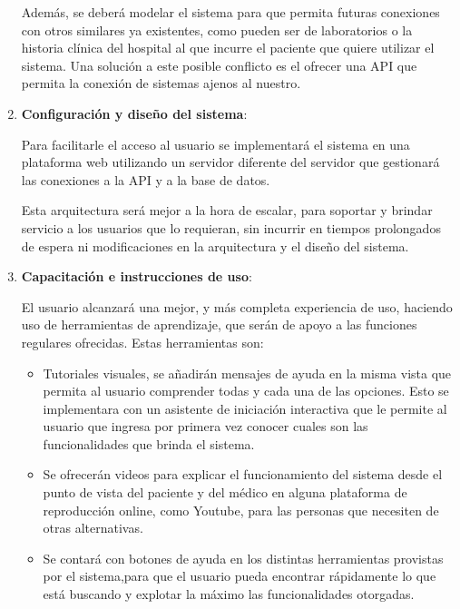 \begin{enumerate}
Además, se deberá modelar el sistema para que permita futuras conexiones con otros similares ya existentes, como pueden ser de laboratorios o la historia clínica del hospital al que incurre el paciente que quiere utilizar el sistema.
Una solución a este posible conflicto es el ofrecer una API que permita la conexión de sistemas ajenos al nuestro.

\item \textbf{Configuración y diseño del sistema}:

Para facilitarle el acceso al usuario se implementará el sistema en una plataforma web utilizando un servidor diferente del servidor que gestionará las conexiones a la API y a la base de datos.

Esta arquitectura será mejor a la hora de escalar, para soportar y brindar servicio a los usuarios que lo requieran, sin incurrir en tiempos prolongados de espera ni modificaciones en la arquitectura y el diseño del sistema.


\item \textbf{Capacitación e instrucciones de uso}:

El usuario alcanzará una mejor, y más completa experiencia de uso, haciendo uso de herramientas de aprendizaje, que serán de apoyo a las funciones regulares ofrecidas.
Estas herramientas son:
	\begin{itemize}
		\item Tutoriales visuales, se añadirán mensajes de ayuda en la misma vista que permita al usuario comprender todas y cada una de las opciones. Esto se implementara con un asistente de iniciación interactiva que le permite al usuario que ingresa por primera vez conocer cuales son las funcionalidades que brinda el sistema.
		\item Se ofrecerán videos para explicar el funcionamiento del sistema desde el punto de vista del paciente y del médico en alguna plataforma de reproducción online, como Youtube, para las personas que necesiten de otras alternativas.
        \item Se contará con botones de ayuda en los distintas herramientas provistas por el sistema,para que el usuario pueda encontrar rápidamente lo que está buscando y explotar la máximo las funcionalidades otorgadas.


\end{itemize}
\end{enumerate}
